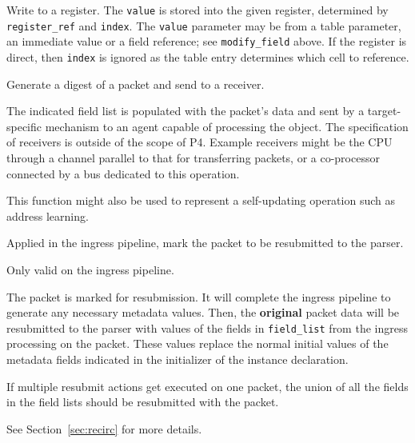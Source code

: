 \documentclass[12pt]{article}
\begin{document}

{\color{red}
{ %
Write to a register.
}
{ %
}
{ %
The \texttt{value} is stored into the given register, determined by \texttt{register_ref} and \texttt{index}.
The \texttt{value} parameter 
may be from a table parameter, an immediate value or a field reference; see \texttt{modify_field} above. 
If the register is direct, then \texttt{index} is ignored as the table entry determines which 
cell to reference. 
}
}


{ %
Generate a digest of a packet and send to a receiver.
}
{ %
}
{ %
The indicated field list is populated with the packet's data and sent by 
a target-specific mechanism to an agent capable of processing the object. 
 The specification of receivers is outside of the scope of P4. Example receivers 
might be the CPU through a channel parallel to that for transferring packets, 
or a co-processor connected by a bus dedicated to this operation. 

This function might also be used to represent a self-updating operation such 
as address learning.
}


{%
Applied in the ingress pipeline, mark the packet to be resubmitted to the 
parser.
}
{ %
}
{ %
Only valid on the ingress pipeline.

The packet is marked for resubmission. It will complete the ingress pipeline 
to generate any necessary metadata values. Then, the \textbf{original} packet data 
will be resubmitted to the parser with values of the fields in \texttt{field_list} from 
the ingress processing on the packet. These values replace the normal initial 
values of the metadata fields indicated in the initializer of the instance 
declaration.

If multiple resubmit actions get executed on one packet, the union of all 
the fields in the field lists should be resubmitted with the packet.

See Section~\ref{sec:recirc} for more details.

}
\end{document}
